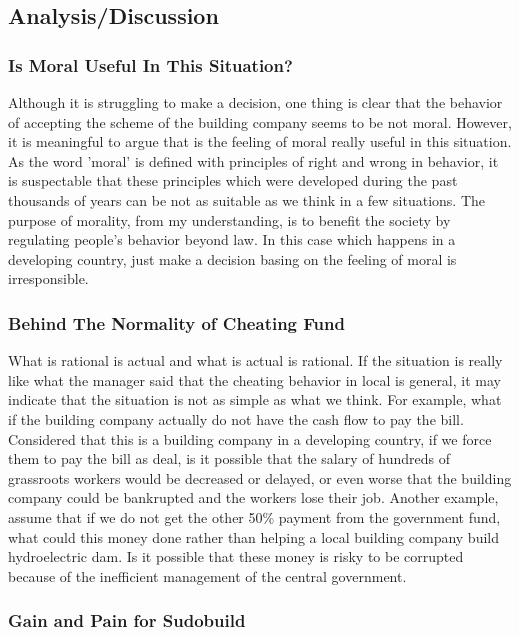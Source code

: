 \documentclass[11pt, a4paper]{article}
\begin{document}
\subsection{Analysis/Discussion}

\subsubsection{Is Moral Useful In This Situation?}

Although it is struggling to make a decision, one thing is clear that the behavior of accepting the scheme of the building company seems to be not moral. However, it is meaningful to argue that is the feeling of moral really useful in this situation. As the word 'moral' is defined with principles of right and wrong in behavior, it is suspectable that these principles which were developed during the past thousands of years can be not as suitable as we think in a few situations. The purpose of morality, from my understanding, is to benefit the society by regulating people's behavior beyond law. In this case which happens in a developing country, just make a decision basing on the feeling of moral is irresponsible.  

\subsubsection{Behind The Normality of Cheating Fund}

What is rational is actual and what is actual is rational. If the situation is really like what the manager said that the cheating behavior in local is general, it may indicate that the situation is not as simple as what we think. For example, what if the building company actually do not have the cash flow to pay the bill. Considered that this is a building company in a developing country, if we force them to pay the bill as deal, is it possible that the salary of hundreds of grassroots workers would be decreased or delayed, or even worse that the building company could be bankrupted and the workers lose their job. Another example, assume that if we do not get the other 50\% payment from the government fund, what could this money done rather than helping a local building company build hydroelectric dam. Is it possible that these money is risky to be corrupted because of the inefficient management of the central government.

\subsubsection{Gain and Pain for Sudobuild}
\end{document}

